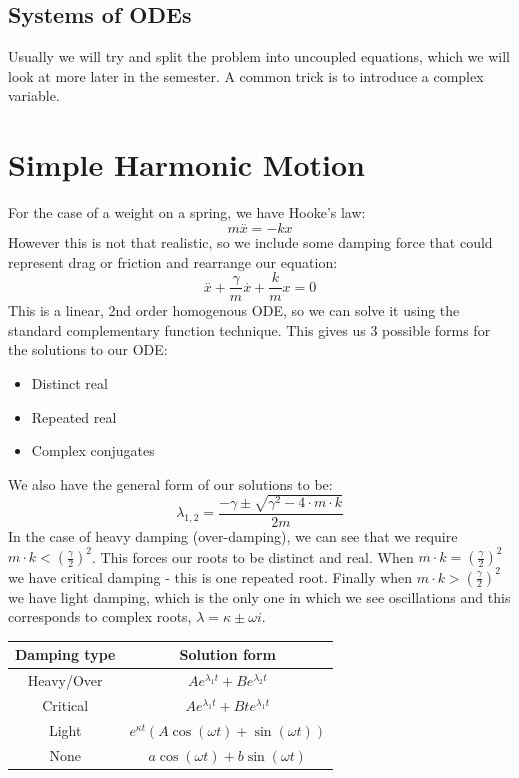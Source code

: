 \documentclass[12pt]{article}
\begin{document}
\subsection*{Systems of ODEs}
Usually we will try and split the problem into uncoupled equations, which we will look at more later in the semester. A common trick is to introduce a complex variable.
\section{Simple Harmonic Motion}
For the case of a weight on a spring, we have Hooke's law:
\[m\overset{..}{x}=-kx\]
However this is not that realistic, so we include some damping force that could represent drag or friction and rearrange our equation:
\[\overset{..}{x}+\frac{\gamma}{m}\overset{.}{x}+\frac{k}{m}x=0\]
This is a linear, 2nd order homogenous ODE, so we can solve it using the standard complementary function technique. This gives us 3 possible forms for the solutions to our ODE:
\begin{itemize}
    \item Distinct real
    \item Repeated real
    \item Complex conjugates
\end{itemize}
We also have the general form of our solutions to be:
\[\lambda_{1,2}=\frac{-\gamma\pm\sqrt{ \gamma^2-4\cdot m\cdot k}}{2m}\]
In the case of heavy damping (over-damping), we can see that we require \(m\cdot k<\left(\frac{\gamma}{2}\right)^2\). This forces our roots to be distinct and real. When \(m\cdot k=\left(\frac{\gamma}{2}\right)^2\) we have critical damping - this is one repeated root. Finally when \(m\cdot k>\left(\frac{\gamma}{2}\right)^2\) we have light damping, which is the only one in which we see oscillations and this corresponds to complex roots, \(\lambda=\kappa\pm\omega i\).
\begin{table}[h]
    \begin{tabular}{c|c}
    \hline
        \textbf{Damping type} & \textbf{Solution form} \\ \hline
        Heavy/Over & \(Ae^{\lambda_1t}+Be^{\lambda_2t}\) \\
        Critical & \(Ae^{\lambda_1t}+Bte^{\lambda_1t}\) \\
        Light & \(e^{\kappa t}\left(A\cos(\omega t)+\sin(\omega t)\right)\) \\
        None & \(a\cos\left(\omega t\right)+b\sin\left(\omega t\right)\)
    \end{tabular}
\end{table}
\end{document}
